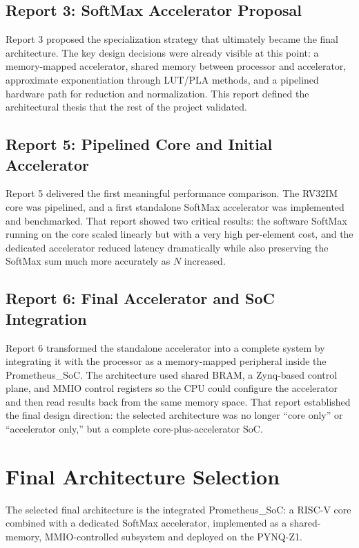 \documentclass[11pt]{article}
\begin{document}
\subsection*{Report 3: SoftMax Accelerator Proposal}
Report 3 proposed the specialization strategy that ultimately became the final architecture. The key design decisions were already visible at this point: a memory-mapped accelerator, shared memory between processor and accelerator, approximate exponentiation through LUT/PLA methods, and a pipelined hardware path for reduction and normalization. This report defined the architectural thesis that the rest of the project validated.

\subsection*{Report 5: Pipelined Core and Initial Accelerator}
Report 5 delivered the first meaningful performance comparison. The RV32IM core was pipelined, and a first standalone SoftMax accelerator was implemented and benchmarked. That report showed two critical results: the software SoftMax running on the core scaled linearly but with a very high per-element cost, and the dedicated accelerator reduced latency dramatically while also preserving the SoftMax sum much more accurately as $N$ increased.

\subsection*{Report 6: Final Accelerator and SoC Integration}
Report 6 transformed the standalone accelerator into a complete system by integrating it with the processor as a memory-mapped peripheral inside the Prometheus\_SoC. The architecture used shared BRAM, a Zynq-based control plane, and MMIO control registers so the CPU could configure the accelerator and then read results back from the same memory space. That report established the final design direction: the selected architecture was no longer ``core only'' or ``accelerator only,'' but a complete core-plus-accelerator SoC.

\section{Final Architecture Selection}

The selected final architecture is the integrated Prometheus\_SoC: a RISC-V core combined with a dedicated SoftMax accelerator, implemented as a shared-memory, MMIO-controlled subsystem and deployed on the PYNQ-Z1.
\end{document}
